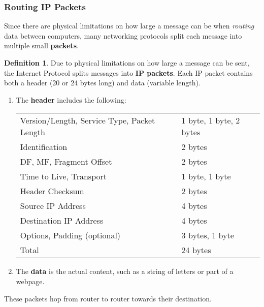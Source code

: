 \documentclass[a4paper, 12pt]{report}
\theoremstyle{remark}
\theoremstyle{definition}
\newtheorem{definition}{Definition}[section]
\begin{document}
\subsubsection{Routing IP Packets}
Since there are physical limitations on how large a message can be when \textit{routing} data between computers, many networking protocols split each message into multiple small \textbf{packets}. 

\begin{definition}
Due to physical limitations on how large a message can be sent, the Internet Protocol splits messages into \textbf{IP packets}. Each IP packet contains both a header (20 or 24 bytes long) and data (variable length). 
\begin{enumerate}
    \item The \textbf{header} includes the following: 
    \begin{center}
    \begin{tabular}{l|l}
        Version/Length, Service Type, Packet Length & 1 byte, 1 byte, 2 bytes \\
        Identification & 2 bytes \\
        DF, MF, Fragment Offset & 2 bytes \\
        Time to Live, Transport & 1 byte, 1 byte \\
        Header Checksum & 2 bytes \\
        Source IP Address & 4 bytes\\
        Destination IP Address & 4 bytes \\
        Options, Padding (optional) & 3 bytes, 1 byte \\
        \hline
        Total & 24 bytes
    \end{tabular}
    \end{center}
    \item The \textbf{data} is the actual content, such as a string of letters or part of a webpage. 
\end{enumerate}
These packets hop from router to router towards their destination.
\end{definition}
\end{document}
